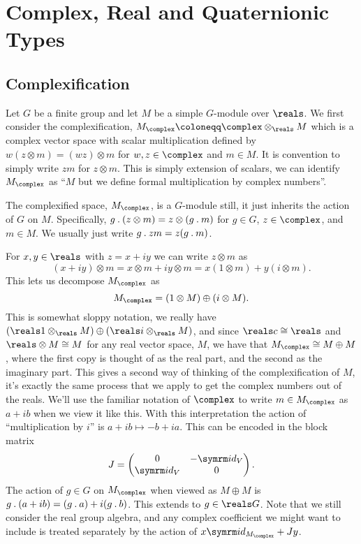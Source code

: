 \chapter{Complex, Real and Quaternionic Types}
\section{Complexification}
Let \(G\) be a finite group and let \(M\) be a simple \(G\)-module over \(\reals\).
We first consider the complexification, \(M_{\complex} \coloneqq \complex \otimes_{\reals} M\) which is a complex vector space with scalar multiplication defined by \(w(z \otimes m) = (wz) \otimes m\) for \(w, z \in \complex\) and \(m \in M\).
It is convention to simply write \(zm\) for \(z \otimes m\).
This is simply extension of scalars, we can identify \(M_{\complex}\) as \enquote{\(M\) but we define formal multiplication by complex numbers}.

The complexified space, \(M_{\complex}\), is a \(G\)-module still, it just inherits the action of \(G\) on \(M\).
Specifically, \(g \mathbin{.} (z \otimes m) = z \otimes (g \mathbin{.} m)\) for \(g \in G\), \(z \in \complex\), and \(m \in M\).
We usually just write \(g \mathbin{.} zm = z(g \mathbin{.} m)\).

For \(x, y \in \reals\) with \(z = x + iy\) we can write \(z \otimes m\) as
\begin{equation}
    (x + iy) \otimes m = x \otimes m + iy \otimes m = x (1 \otimes m) + y (i \otimes m).
\end{equation}
This lets us decompose \(M_{\complex}\) as
\begin{equation}
    M_{\complex} = (1 \otimes M) \oplus (i \otimes M).
\end{equation}
This is somewhat sloppy notation, we really have \((\reals 1 \otimes_{\reals} M) \oplus (\reals i \otimes_{\reals} M)\), and since \(\reals c \isomorphic \reals\) and \(\reals \otimes M \isomorphic M\) for any real vector space, \(M\), we have that \(M_{\complex} \isomorphic M \oplus M\), where the first copy is thought of as the real part, and the second as the imaginary part.
This gives a second way of thinking of the complexification of \(M\), it's exactly the same process that we apply to get the complex numbers out of the reals.
We'll use the familiar notation of \(\complex\) to write \(m \in M_{\complex}\) as \(a + ib\) when we view it like this.
With this interpretation the action of \enquote{multiplication by \(i\)} is \(a + ib \mapsto -b + ia\).
This can be encoded in the block matrix
\begin{equation}
    J = 
    \begin{pmatrix}
        0 & -\id_V\\
        \id_V & 0
    \end{pmatrix}
    .
\end{equation}
The action of \(g \in G\) on \(M_{\complex}\) when viewed as \(M \oplus M\) is \(g \mathbin{.} (a + ib) = (g \mathbin{.} a) + i(g \mathbin{.} b)\).
This extends to \(g \in \reals G\).
Note that we still consider the real group algebra, and any complex coefficient we might want to include is treated separately by the action of \(x\id_{M_{\complex}} + Jy\).